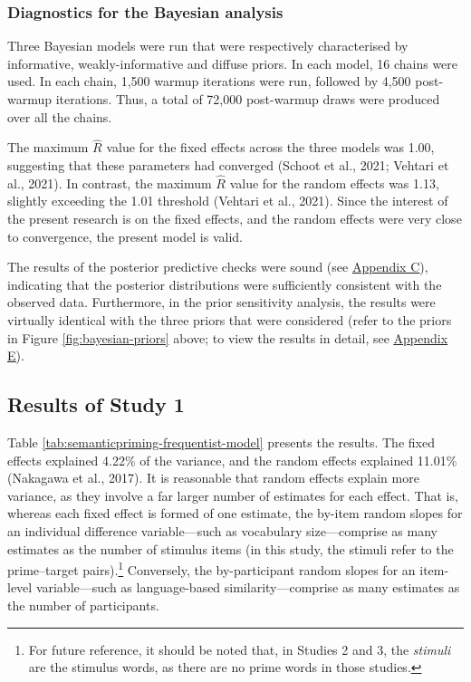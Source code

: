 \documentclass[
  12pt,
  man,floatsintext]{apa7}
\begin{document}
\hypertarget{diagnostics-for-the-bayesian-analysis}{%
\subsubsection{Diagnostics for the Bayesian analysis}\label{diagnostics-for-the-bayesian-analysis}}

Three Bayesian models were run that were respectively characterised by informative, weakly-informative and diffuse priors. In each model, 16 chains were used. In each chain, 1,500 warmup iterations were run, followed by 4,500 post-warmup iterations. Thus, a total of 72,000 post-warmup draws were produced over all the chains.

The maximum \(\widehat R\) value for the fixed effects across the three models was 1.00, suggesting that these parameters had converged (Schoot et al., 2021; Vehtari et al., 2021). In contrast, the maximum \(\widehat R\) value for the random effects was 1.13, slightly exceeding the 1.01 threshold (Vehtari et al., 2021). Since the interest of the present research is on the fixed effects, and the random effects were very close to convergence, the present model is valid.

The results of the posterior predictive checks were sound (see \protect\hyperlink{appendix-C-Bayesian-analysis-diagnostics}{\underline{Appendix C}}), indicating that the posterior distributions were sufficiently consistent with the observed data. Furthermore, in the prior sensitivity analysis, the results were virtually identical with the three priors that were considered (refer to the priors in Figure \ref{fig:bayesian-priors} above; to view the results in detail, see \protect\hyperlink{appendix-E-Bayesian-analysis-results}{\underline{Appendix E}}).

\hypertarget{semanticpriming-results}{%
\subsection{Results of Study 1}\label{semanticpriming-results}}

Table \ref{tab:semanticpriming-frequentist-model} presents the results. The fixed effects explained 4.22\% of the variance, and the random effects explained 11.01\% (Nakagawa et al., 2017). It is reasonable that random effects explain more variance, as they involve a far larger number of estimates for each effect. That is, whereas each fixed effect is formed of one estimate, the by-item random slopes for an individual difference variable---such as vocabulary size---comprise as many estimates as the number of stimulus items (in this study, the stimuli refer to the prime--target pairs).\footnote{For future reference, it should be noted that, in Studies 2 and 3, the \emph{stimuli} are the stimulus words, as there are no prime words in those studies.} Conversely, the by-participant random slopes for an item-level variable---such as language-based similarity---comprise as many estimates as the number of participants.
\end{document}
